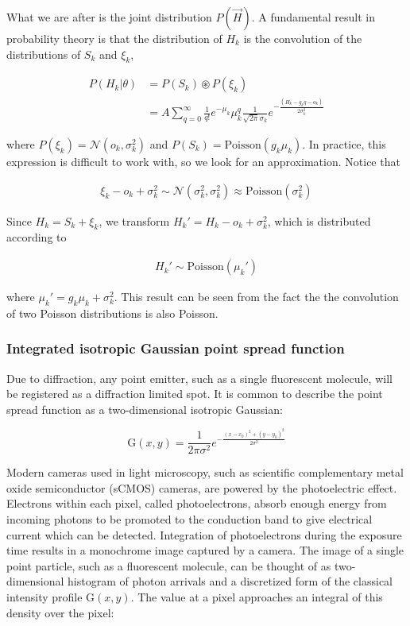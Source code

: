 \documentclass{ucetd}
\begin{document}
What we are after is the joint distribution $P(\vec{H})$. A fundamental result in probability theory is that the distribution of $H_{k}$ is the convolution of the distributions of $S_{k}$ and $\xi_{k}$,

\begin{align}
P(H_{k}|\theta) &= P(S_{k})\circledast P(\xi_{k})\\
&= A\sum_{q=0}^{\infty} \frac{1}{q!}e^{-\mu_{k}}\mu_{k}^{q}\frac{1}{\sqrt{2\pi}\sigma_{k}}e^{-\frac{(H_{k}-g_{k}q-o_{k})}{2\sigma_{k}^{2}}}
\end{align}

where $P(\xi_{k}) = \mathcal{N}(o_{k},\sigma_{k}^{2})$ and $P(S_{k}) = \mathrm{Poisson}(g_{k}\mu_{k})$. In practice, this expression is difficult to work with, so we look for an approximation. Notice that 

\begin{align*}
\xi_{k} - o_{k} + \sigma_{k}^{2} \sim \mathcal{N}(\sigma_{k}^{2},\sigma_{k}^{2}) \approx \mathrm{Poisson}(\sigma_{k}^{2})
\end{align*}

Since $H_{k} = S_{k} + \xi_{k}$, we transform $H_{k}' = H_{k} - o_{k} + \sigma_{k}^{2}$, which is distributed according to 

\begin{align*}
H_{k}' \sim \mathrm{Poisson}(\mu_{k}')
\end{align*}

where $\mu_{k}' = g_{k}\mu_{k} + \sigma_{k}^{2}$. This result can be seen from the fact the the convolution of two Poisson distributions is also Poisson.

\subsubsection{Integrated isotropic Gaussian point spread function}

Due to diffraction, any point emitter, such as a single fluorescent molecule, will be registered as a diffraction limited spot. It is common to describe the point spread function as a two-dimensional isotropic Gaussian:

\begin{equation*}
\mathrm{G}(x,y) = \frac{1}{2\pi\sigma^{2}}e^{-\frac{(x-x_{0})^{2}+(y-y_{0})^{2}}{2\sigma^{2}}}
\end{equation*}

Modern cameras used in light microscopy, such as scientific complementary metal oxide semiconductor (sCMOS) cameras, are powered by the photoelectric effect. Electrons within each pixel, called photoelectrons, absorb enough energy from incoming photons to be promoted to the conduction band to give electrical current which can be detected. Integration of photoelectrons during the exposure time results in a monochrome image captured by a camera. The image of a single point particle, such as a fluorescent molecule, can be thought of as two-dimensional histogram of photon arrivals and a discretized form of the classical intensity profile $\mathrm{G}(x,y)$. The value at a pixel approaches an integral of this density over the pixel:
\end{document}
